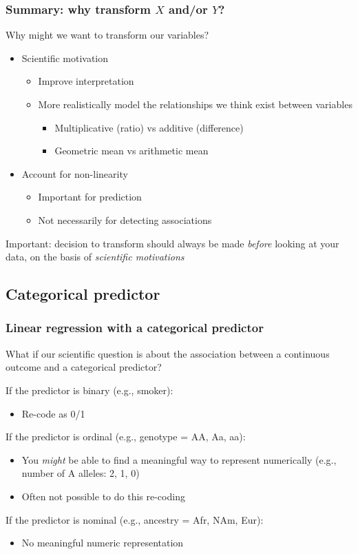 \documentclass[12pt, 
hyperref={colorlinks=true, linkcolor=blue, urlcolor=cyan},dvipsnames]{beamer}
\begin{document}
\begin{frame}
\frametitle{Summary: why transform $X$ and/or $Y$?}
Why might we want to transform our variables? \vspace{-0.3cm}
\begin{itemize}
\item Scientific motivation
	\begin{itemize}
	\item Improve interpretation
	\item More realistically model the relationships we think exist between variables
		\begin{itemize}
		\item Multiplicative (ratio) vs additive (difference)
		\item Geometric mean vs arithmetic mean
		\end{itemize}
	\end{itemize}
\item Account for non-linearity 
	\begin{itemize}
	\item Important for prediction
	\item Not necessarily for detecting associations
	\end{itemize}
\end{itemize}

\color{red} Important: \color{black} decision to transform should always be made \textit{before} looking at your data, on the basis of \textit{scientific motivations}
\end{frame}


\subsection{Categorical predictor}
\begin{frame}
\frametitle{Linear regression with a categorical predictor}

What if our scientific question is about the association between a continuous outcome and a categorical predictor?\pause

If the predictor is binary (e.g., smoker):\vspace{-0.3cm}
\begin{itemize}
\item Re-code as 0/1 
\end{itemize}\pause

If the predictor is ordinal (e.g., genotype = AA, Aa, aa): \vspace{-0.3cm}
\begin{itemize}
\item You \textit{might} be able to find a meaningful way to represent numerically (e.g., number of A alleles: 2, 1, 0)
\item Often not possible to do this re-coding
\end{itemize}\pause

If the predictor is nominal (e.g., ancestry = Afr, NAm, Eur):\vspace{-0.3cm}
\begin{itemize}
\item No meaningful numeric representation
\end{itemize}
\end{frame}
\end{document}
